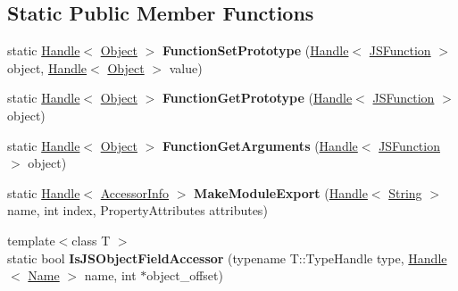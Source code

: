 \subsection*{Static Public Member Functions}
\begin{DoxyCompactItemize}
\item 
\hypertarget{classv8_1_1internal_1_1_accessors_a53f587f18838e892db4f653aa1731ead}{}static \hyperlink{classv8_1_1internal_1_1_handle}{Handle}$<$ \hyperlink{classv8_1_1internal_1_1_object}{Object} $>$ {\bfseries Function\+Set\+Prototype} (\hyperlink{classv8_1_1internal_1_1_handle}{Handle}$<$ \hyperlink{classv8_1_1internal_1_1_j_s_function}{J\+S\+Function} $>$ object, \hyperlink{classv8_1_1internal_1_1_handle}{Handle}$<$ \hyperlink{classv8_1_1internal_1_1_object}{Object} $>$ value)\label{classv8_1_1internal_1_1_accessors_a53f587f18838e892db4f653aa1731ead}

\item 
\hypertarget{classv8_1_1internal_1_1_accessors_acf9265d60f5dacad8df93a69f56e3e4f}{}static \hyperlink{classv8_1_1internal_1_1_handle}{Handle}$<$ \hyperlink{classv8_1_1internal_1_1_object}{Object} $>$ {\bfseries Function\+Get\+Prototype} (\hyperlink{classv8_1_1internal_1_1_handle}{Handle}$<$ \hyperlink{classv8_1_1internal_1_1_j_s_function}{J\+S\+Function} $>$ object)\label{classv8_1_1internal_1_1_accessors_acf9265d60f5dacad8df93a69f56e3e4f}

\item 
\hypertarget{classv8_1_1internal_1_1_accessors_ae3b6c92c1e7c9db932c5f6247408514c}{}static \hyperlink{classv8_1_1internal_1_1_handle}{Handle}$<$ \hyperlink{classv8_1_1internal_1_1_object}{Object} $>$ {\bfseries Function\+Get\+Arguments} (\hyperlink{classv8_1_1internal_1_1_handle}{Handle}$<$ \hyperlink{classv8_1_1internal_1_1_j_s_function}{J\+S\+Function} $>$ object)\label{classv8_1_1internal_1_1_accessors_ae3b6c92c1e7c9db932c5f6247408514c}

\item 
\hypertarget{classv8_1_1internal_1_1_accessors_a659f5cfdc0ce5805f19fd0fe320e4e5c}{}static \hyperlink{classv8_1_1internal_1_1_handle}{Handle}$<$ \hyperlink{classv8_1_1internal_1_1_accessor_info}{Accessor\+Info} $>$ {\bfseries Make\+Module\+Export} (\hyperlink{classv8_1_1internal_1_1_handle}{Handle}$<$ \hyperlink{classv8_1_1internal_1_1_string}{String} $>$ name, int index, Property\+Attributes attributes)\label{classv8_1_1internal_1_1_accessors_a659f5cfdc0ce5805f19fd0fe320e4e5c}

\item 
\hypertarget{classv8_1_1internal_1_1_accessors_afa5feef994ec0e612298407860c2b472}{}{\footnotesize template$<$class T $>$ }\\static bool {\bfseries Is\+J\+S\+Object\+Field\+Accessor} (typename T\+::\+Type\+Handle type, \hyperlink{classv8_1_1internal_1_1_handle}{Handle}$<$ \hyperlink{classv8_1_1internal_1_1_name}{Name} $>$ name, int $\ast$object\+\_\+offset)\label{classv8_1_1internal_1_1_accessors_afa5feef994ec0e612298407860c2b472}


\end{DoxyCompactItemize}
